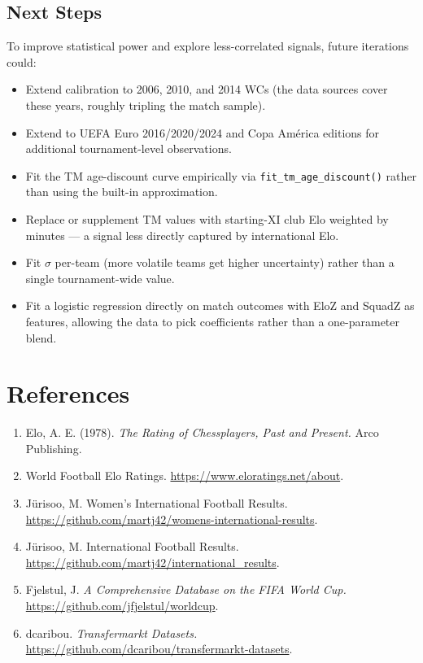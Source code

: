 \documentclass[11pt]{article}
\begin{document}
\subsection{Next Steps}

To improve statistical power and explore less-correlated signals, future iterations could:
\begin{itemize}[nosep]
    \item Extend calibration to 2006, 2010, and 2014 WCs (the data sources cover these years, roughly tripling the match sample).
    \item Extend to UEFA Euro 2016/2020/2024 and Copa Am\'erica editions for additional tournament-level observations.
    \item Fit the TM age-discount curve empirically via \texttt{fit\_tm\_age\_discount()} rather than using the built-in approximation.
    \item Replace or supplement TM values with starting-XI club Elo weighted by minutes --- a signal less directly captured by international Elo.
    \item Fit $\sigma$ per-team (more volatile teams get higher uncertainty) rather than a single tournament-wide value.
    \item Fit a logistic regression directly on match outcomes with EloZ and SquadZ as features, allowing the data to pick coefficients rather than a one-parameter blend.
\end{itemize}

\section*{References}

\begin{enumerate}[nosep]
    \item Elo, A. E. (1978). \textit{The Rating of Chessplayers, Past and Present.} Arco Publishing.
    \item World Football Elo Ratings. \url{https://www.eloratings.net/about}.
    \item J\"urisoo, M. Women's International Football Results. \url{https://github.com/martj42/womens-international-results}.
    \item J\"urisoo, M. International Football Results. \url{https://github.com/martj42/international_results}.
    \item Fjelstul, J. \textit{A Comprehensive Database on the FIFA World Cup.} \url{https://github.com/jfjelstul/worldcup}.
    \item dcaribou. \textit{Transfermarkt Datasets.} \url{https://github.com/dcaribou/transfermarkt-datasets}.
\end{enumerate}
\end{document}
